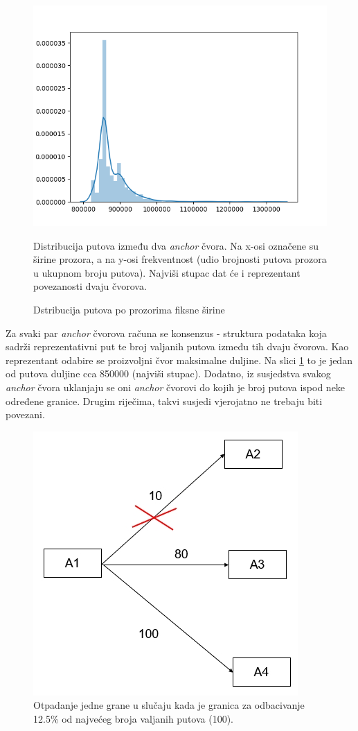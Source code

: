 \documentclass[times, utf8, seminar, numeric]{fer}
\begin{document}
\begin{figure}[h]
	\centering
	\centerline{\includegraphics[width=0.7\linewidth]{img/distribution}}
	\caption{Dstribucija putova po prozorima fiksne širine}
	\label{fig:distribution}
	\small
	Distribucija putova između dva \textit{anchor} čvora. Na x-osi označene su širine prozora, a na y-osi frekventnost (udio brojnosti putova prozora u ukupnom broju putova). Najviši stupac dat će i reprezentant povezanosti dvaju čvorova.
\end{figure}

Za svaki par \textit{anchor} čvorova računa se konsenzus - struktura podataka koja sadrži reprezentativni put te broj valjanih putova između tih dvaju čvorova. Kao reprezentant odabire se proizvoljni čvor maksimalne duljine. Na slici \ref{fig:distribution} to je jedan od putova duljine cca 850000 (najviši stupac). Dodatno, iz susjedstva svakog \textit{anchor} čvora uklanjaju se oni \textit{anchor} čvorovi do kojih je broj putova ispod neke određene granice. Drugim riječima, takvi susjedi vjerojatno ne trebaju biti povezani.

\begin{figure}[h]
	\centering
	\centerline{\includegraphics[width=0.7\linewidth]{img/valid_path_numbers_filtered}}
	\caption{Otpadanje jedne grane u slučaju kada je granica za odbacivanje 12.5\% od najvećeg broja valjanih putova (100).}
	\label{fig:validpathnumbersfiltered}
\end{figure}
\end{document}
